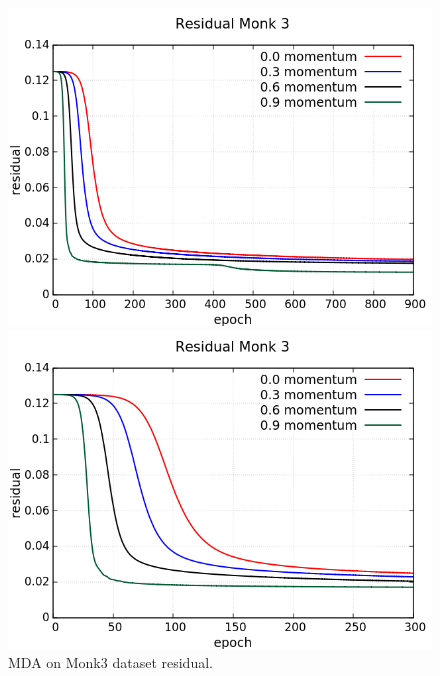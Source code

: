 \begin{figure}[H]
	\centering
	\begin{minipage}[t]{0.5\linewidth}
		\includegraphics[width=\linewidth]{data/MGD/Monk3/M/Monk3_MGD_Residual_standard.png}
	\end{minipage}%
	\begin{minipage}[t]{0.5\linewidth}
		\includegraphics[width=\linewidth]{data/MGD/Monk3/M/Monk3_MGD_Residual_zoom.png}
	\end{minipage}
	\caption{MDA on Monk3 dataset residual.}
\end{figure}
